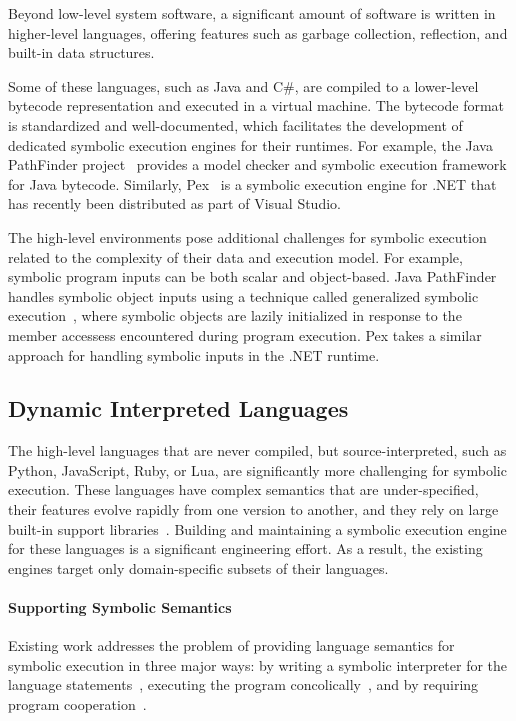 Beyond low-level system software, a significant amount of software is written in higher-level languages, offering features such as garbage collection, reflection, and built-in data structures.

Some of these languages, such as Java and C\#, are compiled to a lower-level bytecode representation and executed in a virtual machine.
%
The bytecode format is standardized and well-documented, which facilitates the development of dedicated symbolic execution engines for their runtimes.
%
For example, the Java PathFinder project~\cite{visser-jpf,jpf-symbex,jpf-testgen} provides a model checker and symbolic execution framework for Java bytecode.
%
Similarly, Pex~\cite{tillmann-pex} is a symbolic execution engine for .NET that has recently been distributed as part of Visual Studio.

The high-level environments pose additional challenges for symbolic execution related to the complexity of their data and execution model.  For example, symbolic program inputs can be both scalar and object-based.
%
Java PathFinder handles symbolic object inputs using a technique called generalized symbolic execution~\cite{generalized-symbex}, where symbolic objects are lazily initialized in response to the member accessess encountered during program execution.  Pex takes a similar approach for handling symbolic inputs in the .NET runtime.

\subsection{Dynamic Interpreted Languages}

The high-level languages that are never compiled, but source-interpreted, such as Python, JavaScript, Ruby, or Lua, are significantly more challenging for symbolic execution.
%
These languages have complex semantics that are under-specified, their features evolve rapidly from one version to another, and they rely on large built-in support libraries~\cite{dom2011,cutie-py,pythonReference}.
%
Building and maintaining a symbolic execution engine for these languages is a significant engineering effort.  As a result, the existing engines target only domain-specific subsets of their languages.

\paragraph{Supporting Symbolic Semantics}

Existing work addresses the problem of providing language semantics for symbolic execution in three major ways: by writing a symbolic interpreter for the language statements~\cite{nice}, executing the program concolically~\cite{cutie-py,jalangi}, and by requiring program cooperation~\cite{commuter}.

